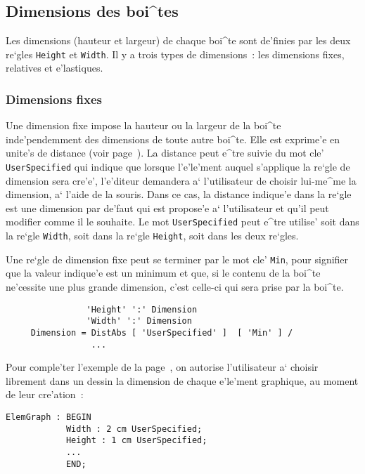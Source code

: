 {\begin{example}
\end{example}

\subsection{Dimensions des boi^tes}
\label{dimension}

Les dimensions (hauteur et largeur) de chaque boi^te sont de'finies par les
deux re`gles {\tt Height} et {\tt Width}. Il y a trois types de dimensions~:
les dimensions fixes, relatives et e'lastiques.

\subsubsection{Dimensions fixes}

Une dimension fixe impose la hauteur ou la largeur de la boi^te
inde'pendemment des dimensions de toute autre boi^te. Elle est exprime'e
en unite's de distance (voir page~\pageref{unites}).
La distance peut e^tre suivie du mot cle' {\tt UserSpecified} qui indique
que lorsque l'e'le'ment auquel s'applique la re`gle de dimension sera cre'e',
l'e'diteur demandera a` l'utilisateur de choisir lui-me^me la dimension,
a` l'aide de la souris. Dans ce cas, la distance indique'e dans la re`gle
est une dimension par de'faut qui est propose'e a` l'utilisateur et
qu'il peut modifier comme il le souhaite. Le mot {\tt UserSpecified} peut
e^tre utilise' soit dans la re`gle {\tt Width}, soit dans la re`gle
{\tt Height}, soit dans les deux re`gles.

Une re`gle de dimension fixe peut se terminer par le mot cle' {\tt Min},
pour signifier que la valeur indique'e est un minimum et que, si le
contenu de la boi^te ne'cessite une plus grande dimension, c'est celle-ci
qui sera prise par la boi^te.

\begin{verbatim}
                'Height' ':' Dimension
                'Width' ':' Dimension
     Dimension = DistAbs [ 'UserSpecified' ]  [ 'Min' ] /
                 ...
\end{verbatim}

\begin{example}
Pour comple'ter l'exemple de la page~\pageref{expos2}, on autorise
l'utilisateur a` choisir librement dans un dessin la dimension de chaque
e'le'ment graphique, au moment de leur cre'ation~:

\begin{verbatim}
ElemGraph : BEGIN
            Width : 2 cm UserSpecified;
            Height : 1 cm UserSpecified;
            ...
            END;
\end{verbatim}


\end{example}}
